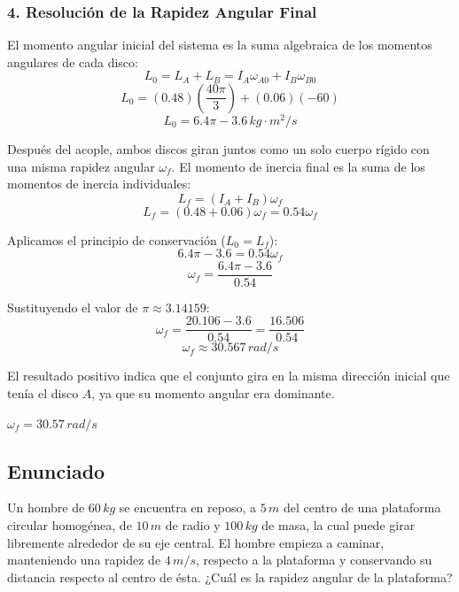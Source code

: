 \documentclass[12pt, a4paper]{article}
\begin{document}
\subsubsection*{4. Resolución de la Rapidez Angular Final}
El momento angular inicial del sistema es la suma algebraica de los momentos angulares de cada disco:
$$L_0 = L_A + L_B = I_A \omega_{A0} + I_B \omega_{B0}$$
$$L_0 = (0.48)\left(\frac{40\pi}{3}\right) + (0.06)(-60)$$
$$L_0 = 6.4\pi - 3.6 \, \si{kg\cdot m^2/s}$$

Después del acople, ambos discos giran juntos como un solo cuerpo rígido con una misma rapidez angular $\omega_f$. El momento de inercia final es la suma de los momentos de inercia individuales:
$$L_f = (I_A + I_B) \omega_f$$
$$L_f = (0.48 + 0.06) \omega_f = 0.54 \omega_f$$

Aplicamos el principio de conservación ($L_0 = L_f$):
$$6.4\pi - 3.6 = 0.54 \omega_f$$
$$\omega_f = \frac{6.4\pi - 3.6}{0.54}$$

Sustituyendo el valor de $\pi \approx 3.14159$:
$$\omega_f = \frac{20.106 - 3.6}{0.54} = \frac{16.506}{0.54}$$
$$\omega_f \approx 30.567 \, \si{rad/s}$$

El resultado positivo indica que el conjunto gira en la misma dirección inicial que tenía el disco $A$, ya que su momento angular era dominante.

\begin{tcolorbox}[colback=green!5!white, colframe=green!50!black, title=Respuesta Final]
\centering \Large $\omega_f = 30.57 \, \si{rad/s}$
\end{tcolorbox}

\newpage

\subsection*{Enunciado}
Un hombre de $60 \, \si{kg}$ se encuentra en reposo, a $5 \, \si{m}$ del centro de una plataforma circular homogénea, de $10 \, \si{m}$ de radio y $100 \, \si{kg}$ de masa, la cual puede girar libremente alrededor de su eje central. El hombre empieza a caminar, manteniendo una rapidez de $4 \, \si{m/s}$, respecto a la plataforma y conservando su distancia respecto al centro de ésta. ¿Cuál es la rapidez angular de la plataforma?

\begin{center}
\end{center}
\end{document}

